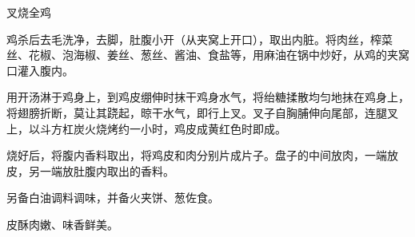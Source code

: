 \begin{recipe}{叉烧全鸡}

\ingredients




\cooking

鸡杀后去毛洗净，去脚，肚腹小开（从夹窝上开口），取出内脏。将肉丝，榨菜丝、花椒、泡海椒、姜丝、葱丝、酱油、食盐等，用麻油在锅中炒好，从鸡的夹窝口灌入腹内。

用开汤淋于鸡身上，到鸡皮绷伸时抹干鸡身水气，将绐糖揉散均匀地抹在鸡身上，将翅膀折断，莫让其跷起，晾干水气，即行上叉。叉子自胸脯伸向尾部，连腿叉上，以斗方杠炭火烧烤约一小时，鸡皮成黄红色时即成。

烧好后，将腹内香料取出，将鸡皮和肉分别片成片子。盘子的中间放肉，一端放皮，另一端放肚腹内取出的香料。

另备白油调料调味，并备火夹饼、葱佐食。

\notes

皮酥肉嫩、味香鲜美。

\end{recipe}

